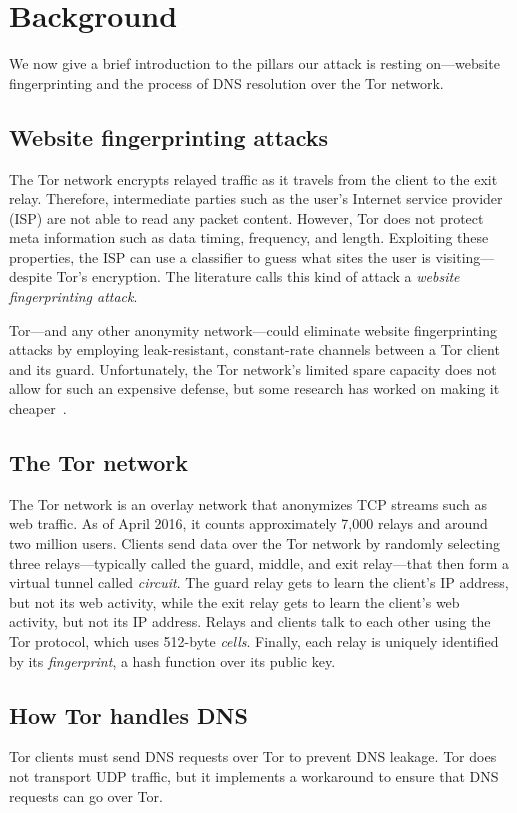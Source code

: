 \section{Background}
\label{sec:background}
We now give a brief introduction to the pillars our attack is resting
on---website fingerprinting and the process of DNS resolution over the Tor
network.

\subsection{Website fingerprinting attacks}
The Tor network encrypts relayed traffic as it travels from the client to the
exit relay.  Therefore, intermediate parties such as the user's Internet service
provider (ISP) are not able to read any packet content.  However, Tor does not
protect meta information such as data timing, frequency, and length.  Exploiting
these properties, the ISP can use a classifier to guess what sites the user is
visiting---despite Tor's encryption.  The literature calls this kind of attack a
\emph{website fingerprinting attack}.

Tor---and any other anonymity network---could eliminate website fingerprinting
attacks by employing leak-resistant, constant-rate channels between a Tor client
and its guard.  Unfortunately, the Tor network's limited spare capacity does not
allow for such an expensive defense, but some research has worked on making it
cheaper~\cite{Cai2014a}.

\subsection{The Tor network}
The Tor network is an overlay network that anonymizes TCP streams such as web
traffic.  As of April 2016, it counts approximately 7,000 relays and around two
million users.  Clients send data over the Tor network by randomly selecting
three relays---typically called the guard, middle, and exit relay---that then
form a virtual tunnel called \emph{circuit}.  The guard relay gets to learn the
client's IP address, but not its web activity, while the exit relay gets to
learn the client's web activity, but not its IP address.  Relays and clients
talk to each other using the Tor protocol, which uses 512-byte \emph{cells}.
Finally, each relay is uniquely identified by its \emph{fingerprint}, a hash
function over its public key.

\subsection{How Tor handles DNS}
\label{sec:tordns}
Tor clients must send DNS requests over Tor to prevent DNS leakage.  Tor
does not transport UDP traffic, but it implements a workaround to ensure that
DNS requests can go over Tor.


